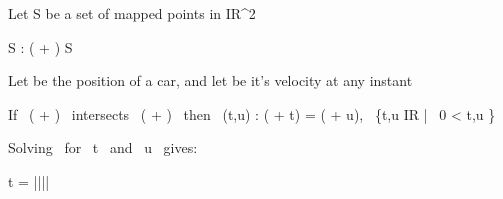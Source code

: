 Let S be a set of mapped points in \rm I\!R^2 \n

\forall {} \in S \exists {} : ( + ) \in S \n

Let  be the position of a car, and let  be it's velocity at any instant \n

If \ ( + ) \ intersects \ ( + ) \ then \ \exists(t,u) : ( + t) = ( + u), \ \{t,u \in \rm I\!R | \ 0 < t,u \}

Solving \ for \ t \ and \ u \ gives: \n

t = \bigg|\bigg[\begin{matrix} (x_1 - p_1) & v_1 \\ (x_2 - p_2) & v_2 \end{matrix}\bigg]\bigg|\cdot \bigg|\bigg[\begin{matrix} r_1 & v_1 \\ r_2 & v_2 \end{matrix}\bigg]\bigg|